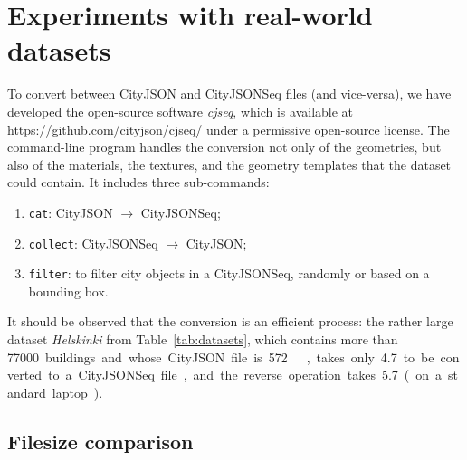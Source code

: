 \documentclass[11pt,halfparskip,parskip=half]{scrartcl}
\begin{document}
%
\section{Experiments with real-world datasets}%
\label{sec:experiments}


To convert between CityJSON and CityJSONSeq files (and vice-versa), we have developed the open-source software \emph{cjseq}, which is available at \url{https://github.com/cityjson/cjseq/} under a permissive open-source license.
The command-line program handles the conversion not only of the geometries, but also of the materials, the textures, and the geometry templates that the dataset could contain.
It includes three sub-commands:
\begin{enumerate}
  \item \texttt{cat}: CityJSON $\rightarrow$ CityJSONSeq;
  \item \texttt{collect}: CityJSONSeq $\rightarrow$ CityJSON;
  \item \texttt{filter}: to filter city objects in a CityJSONSeq, randomly or based on a bounding box.
\end{enumerate}

It should be observed that the conversion is an efficient process: the rather large dataset \emph{Helskinki} from Table~\ref{tab:datasets}, which contains more than \qty{77000} buildings and whose CityJSON file is \qty{572}{\mega\byte}, takes only \qty{4.7}{\sec} to be converted to a CityJSONSeq file, and the reverse operation takes \qty{5.7}{\sec} (on a standard laptop).



\subsection{Filesize comparison}
\end{document}
